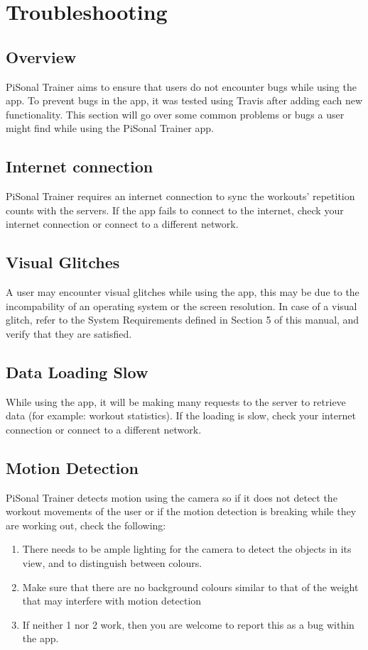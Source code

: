 \documentclass{article}
\begin{document}
\section{Troubleshooting}
\subsection{Overview}
PiSonal Trainer aims to ensure that users do not encounter bugs while using the app. To prevent bugs in the app, it was tested using Travis after adding each new functionality. This section will go over some common problems or bugs a user might find while using the PiSonal Trainer app.

\subsection{Internet connection}
PiSonal Trainer requires an internet connection to sync the workouts' repetition counts with the servers. If the app fails to connect to the internet, check your internet connection or connect to a different network.

\subsection{Visual Glitches}
A user may encounter visual glitches while using the app, this may be due to the incompability of an operating system or the screen resolution. In case of a visual glitch, refer to the System Requirements defined in Section 5 of this manual, and verify that they are satisfied.

\subsection{Data Loading Slow}
While using the app, it will be making many requests to the server to retrieve data (for example: workout statistics). If the loading is slow, check your internet connection or connect to a different network.

\subsection{Motion Detection}
PiSonal Trainer detects motion using the camera so if it does not detect the workout movements of the user or if the motion detection is breaking while they are working out, check the following:

\begin{enumerate}
    \item There needs to be ample lighting for the camera to detect the objects in its view, and to distinguish between colours.
    \item Make sure that there are no background colours similar to that of the weight that may interfere with motion detection
    \item If neither 1 nor 2 work, then you are welcome to report this as a bug within the app.
\end{enumerate}
\end{document}
